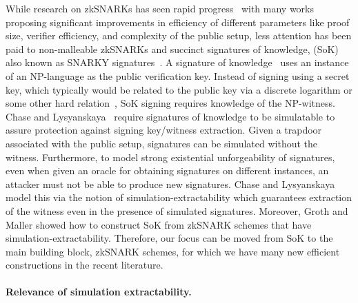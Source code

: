 While research on zkSNARKs has seen rapid progress~\cite{EC:GGPR13,AC:Groth10a,TCC:Lipmaa12,TCC:BCIOP13,SP:PHGR13,C:BCGTV13,AC:Lipmaa13,USENIX:BCTV14,EC:Groth16} with many works proposing significant improvements in efficiency of different parameters like proof size, verifier efficiency, and complexity of the public setup, less attention has been paid to non-malleable zkSNARKs and succinct signatures of knowledge, (SoK) also known as SNARKY signatures~\cite{C:GroMal17,EPRINT:BKSV20}. A signature of knowledge~\cite{C:CamSta97,C:ChaLys06} uses an instance of an NP-language as the public verification key. Instead of signing using a secret key, which typically would be related to the public key via a discrete logarithm or some other hard relation~\cite{AC:DHLW10}, SoK signing requires knowledge of the NP-witness. Chase and Lysyanskaya~\cite{C:ChaLys06} require signatures of knowledge to be simulatable to assure protection against signing key/witness extraction. Given a trapdoor associated with the public setup, signatures can be simulated without the witness. Furthermore, to model strong existential unforgeability of signatures, even when given an oracle for obtaining signatures on different instances, an attacker must not be able to produce new signatures. Chase and Lysyanskaya model this via the notion of simulation-extractability which guarantees extraction of the witness even in the presence of simulated signatures.
Moreover,  Groth and Maller \cite{C:GroMal17} showed how to construct 
SoK from zkSNARK schemes that have simulation-extractability. 
Therefore, our focus can be moved from SoK to the main building block,  zkSNARK schemes,  for which we have many new efficient constructions in the recent literature. 
 

\paragraph{Relevance of simulation extractability.}

